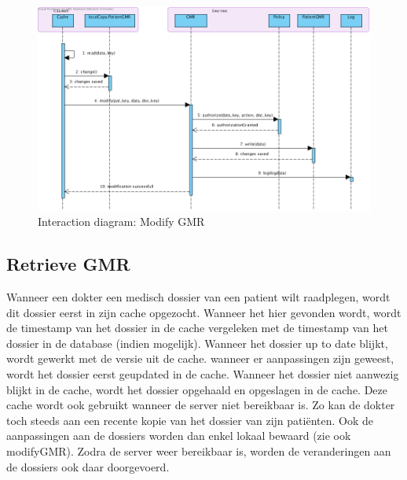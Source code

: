 \documentclass[a4paper,10pt]{article}
\begin{document}
\begin{figure}[!h]
  \includegraphics[width=\textwidth]{../images/modifyGMR.png}
  \caption{Interaction diagram: Modify GMR}
\end{figure}

\subsection{Retrieve GMR}
\label{interaction:retrieveGMR}
Wanneer een dokter een medisch dossier van een patient wilt raadplegen, wordt dit dossier eerst in zijn cache opgezocht. Wanneer het hier gevonden wordt, wordt de timestamp van het dossier in de cache vergeleken met de timestamp van het dossier in de database (indien mogelijk). Wanneer het dossier up to date blijkt, wordt gewerkt met de versie uit de cache. wanneer er aanpassingen zijn geweest, wordt het dossier eerst geupdated in de cache. Wanneer het dossier niet aanwezig blijkt in de cache, wordt het dossier opgehaald en opgeslagen in de cache. 
Deze cache wordt ook gebruikt wanneer de server niet bereikbaar is. Zo kan de dokter toch steeds aan een recente kopie van het dossier van zijn patiënten. Ook de aanpassingen aan de dossiers worden dan enkel lokaal bewaard (zie ook modifyGMR). Zodra de server weer bereikbaar is, worden de veranderingen aan de dossiers ook daar doorgevoerd. 
\end{document}
